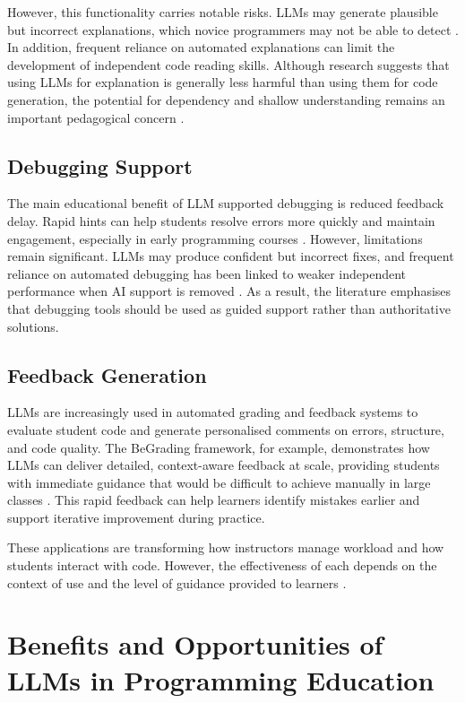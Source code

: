 \documentclass[10pt,journal,compsoc]{IEEEtran}
\begin{document}
However, this functionality carries notable risks. LLMs may generate plausible but incorrect explanations, which novice programmers may not be able to detect \cite{Kasneci2023}. In addition, frequent reliance on automated explanations can limit the development of independent code reading skills. Although research suggests that using LLMs for explanation is generally less harmful than using them for code generation, the potential for dependency and shallow understanding remains an important pedagogical concern \cite{app14104115}.


\subsection{Debugging Support}
The main educational benefit of LLM supported debugging is reduced feedback delay. Rapid hints can help students resolve errors more quickly and maintain engagement, especially in early programming courses \cite{Deriba2023}. However, limitations remain significant. LLMs may produce confident but incorrect fixes, and frequent reliance on automated debugging has been linked to weaker independent performance when AI support is removed \cite{Santos2024, Macneil2024, Kasneci2023}. As a result, the literature emphasises that debugging tools should be used as guided support rather than authoritative solutions.

\subsection{Feedback Generation}
LLMs are increasingly used in automated grading and feedback systems to evaluate student code and generate personalised comments on errors, structure, and code quality. The BeGrading framework, for example, demonstrates how LLMs can deliver detailed, context-aware feedback at scale, providing students with immediate guidance that would be difficult to achieve manually in large classes \cite{Yousef2025, Messer2024}. This rapid feedback can help learners identify mistakes earlier and support iterative improvement during practice.

These applications are transforming how instructors manage workload and how students interact with code. However, the effectiveness of each depends on the context of use and the level of guidance provided to learners \cite{10.1145/3696630.3727236}.

\section{Benefits and Opportunities of LLMs in Programming Education}
\label{sec:benefits}
\end{document}
